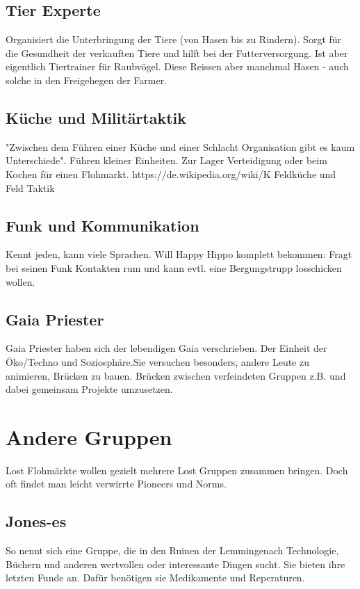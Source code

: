 \documentclass{book}
\begin{document}
\section{Tier Experte}

Organisiert die Unterbringung der Tiere (von Hasen bis zu Rindern). Sorgt für die Gesundheit der verkauften Tiere und hilft bei der Futterversorgung. Ist aber eigentlich Tiertrainer für Raubvögel. Diese Reissen aber manchmal Hasen - auch solche in den Freigehegen der Farmer.

\section{Küche und Militärtaktik}
"Zwischen dem Führen einer Küche und einer Schlacht Organisation gibt es kaum Unterschiede". Führen kleiner Einheiten. Zur Lager Verteidigung oder beim Kochen für einen Flohmarkt. https://de.wikipedia.org/wiki/K%
Feldküche und Feld Taktik

\section{Funk und Kommunikation}
Kennt jeden, kann viele Sprachen. Will Happy Hippo komplett bekommen: Fragt bei seinen Funk Kontakten rum und kann evtl. eine Bergungstrupp losschicken wollen.

\section{Gaia Priester}
Gaia Priester haben sich der lebendigen Gaia verschrieben. Der Einheit der Öko/Techno und Soziosphäre.Sie versuchen besonders, andere Leute zu animieren,  Brücken zu bauen. Brücken zwischen verfeindeten Gruppen z.B. und dabei gemeinsam Projekte umzusetzen.


\chapter{Andere Gruppen}

Lost Flohmärkte wollen gezielt mehrere Lost Gruppen zusammen bringen. Doch oft findet man leicht verwirrte Pioneers und Norms.

\section{Jones-es}

So nennt sich eine Gruppe, die in den Ruinen der Lemmingenach Technologie, Büchern und anderen wertvollen oder interessante Dingen sucht. Sie bieten ihre letzten Funde an. Dafür benötigen sie Medikamente und Reperaturen.
\end{document}
